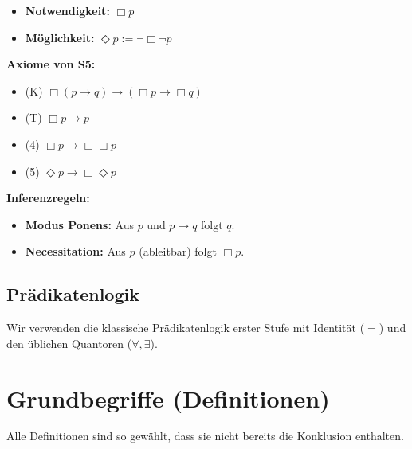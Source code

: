 \documentclass[
]{article}
\begin{document}
\begin{itemize}
\item \textbf{Notwendigkeit:} \(\Box p\)
\item \textbf{Möglichkeit:} \(\Diamond p := \neg\Box\neg p\)
\end{itemize}

\textbf{Axiome von S5:}
\begin{itemize}
\item (K) \(\Box(p \rightarrow q) \rightarrow (\Box p \rightarrow \Box q)\)
\item (T) \(\Box p \rightarrow p\)
\item (4) \(\Box p \rightarrow \Box\Box p\)
\item (5) \(\Diamond p \rightarrow \Box\Diamond p\)
\end{itemize}

\textbf{Inferenzregeln:}
\begin{itemize}
\item \textbf{Modus Ponens:} Aus \(p\) und \(p \rightarrow q\) folgt \(q\).
\item \textbf{Necessitation:} Aus \(p\) (ableitbar) folgt \(\Box p\).
\end{itemize}

\subsection{Prädikatenlogik}\label{pruxe4dikatenlogik}

Wir verwenden die klassische Prädikatenlogik erster Stufe mit Identität (\(=\)) und den üblichen Quantoren (\(\forall, \exists\)).

\section{Grundbegriffe (Definitionen)}\label{grundbegriffe-definitionen}

Alle Definitionen sind so gewählt, dass sie nicht bereits die Konklusion enthalten.
\end{document}
